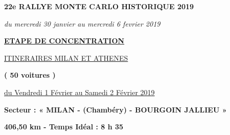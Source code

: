 \documentclass{article}%
\begin{document}
%
\normalsize%
\begin{center} \textbf{\LARGE{22e RALLYE MONTE CARLO HISTORIQUE 2019}} \end{center}%
\begin{center} \textit{du mercredi 30 janvier au mercredi 6 fevrier 2019} \end{center}%
\begin{center} \textbf{\underline{ETAPE DE CONCENTRATION}} \end{center}%
\begin{center} \underline{ITINERAIRES  MILAN ET ATHENES} \end{center}%
\begin{center} \textbf{( 50 voitures )} \end{center}%
\begin{flushright} \underline{du  Vendredi 1 Février au Samedi 2 Février 2019} \end{flushright}%
\begin{flushleft} \textbf{Secteur : «  MILAN - (Chambéry) - BOURGOIN JALLIEU  »
} \end{flushleft}%
\begin{flushright} \textbf{406,50 km - Temps Idéal : 8 h 35 
} \end{flushright}%
\end{document}
